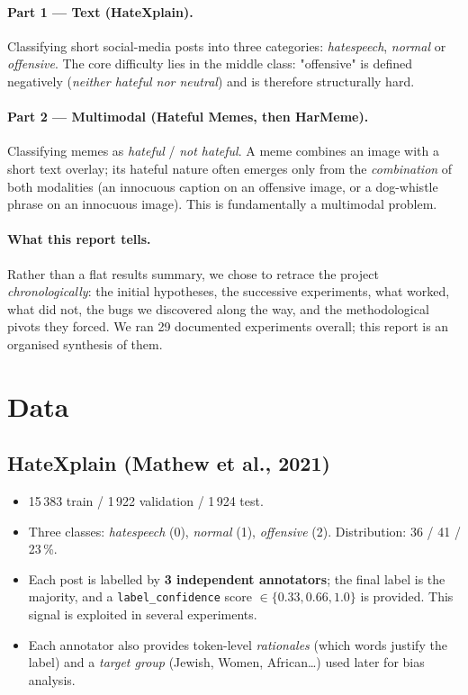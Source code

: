 \documentclass[11pt,a4paper]{article}
\begin{document}
\paragraph{Part 1 --- Text (HateXplain).}
Classifying short social-media posts into three categories: \emph{hatespeech},
\emph{normal} or \emph{offensive}. The core difficulty lies in the middle class:
"offensive" is defined negatively (\emph{neither hateful nor neutral}) and is
therefore structurally hard.

\paragraph{Part 2 --- Multimodal (Hateful Memes, then HarMeme).}
Classifying memes as \emph{hateful} / \emph{not hateful}. A meme combines an image
with a short text overlay; its hateful nature often emerges only from the
\emph{combination} of both modalities (an innocuous caption on an offensive image,
or a dog-whistle phrase on an innocuous image). This is fundamentally a multimodal
problem.

\paragraph{What this report tells.}
Rather than a flat results summary, we chose to retrace the project
\emph{chronologically}: the initial hypotheses, the successive experiments, what
worked, what did not, the bugs we discovered along the way, and the methodological
pivots they forced. We ran 29 documented experiments overall; this report is an
organised synthesis of them.

\section{Data}

\subsection{HateXplain (Mathew et al., 2021)}

\begin{itemize}[leftmargin=*]
    \item 15\,383 train / 1\,922 validation / 1\,924 test.
    \item Three classes: \emph{hatespeech} (0), \emph{normal} (1), \emph{offensive} (2).
    Distribution: 36 / 41 / 23\,\%.
    \item Each post is labelled by \textbf{3 independent annotators}; the final
    label is the majority, and a \texttt{label\_confidence} score
    $\in \{0.33, 0.66, 1.0\}$ is provided. This signal is exploited in several
    experiments.
    \item Each annotator also provides token-level \emph{rationales} (which words
    justify the label) and a \emph{target group} (Jewish, Women, African\dots) used
    later for bias analysis.
\end{itemize}
\end{document}
